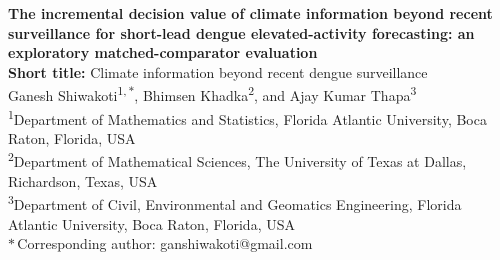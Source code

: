 \documentclass[11pt,a4paper]{article}
\begin{document}
\begin{center}
{\Large \textbf{The incremental decision value of climate information beyond recent surveillance for short-lead dengue elevated-activity forecasting: an exploratory matched-comparator evaluation}}\\[1.0em]

{\normalsize \textbf{Short title:} Climate information beyond recent dengue surveillance}\\[1.2em]

Ganesh Shiwakoti\textsuperscript{1,\,$\ast$}, Bhimsen Khadka\textsuperscript{2}, and Ajay Kumar Thapa\textsuperscript{3}\\[0.6em]

\footnotesize
\textsuperscript{1}Department of Mathematics and Statistics, Florida Atlantic University, Boca Raton, Florida, USA\\
\textsuperscript{2}Department of Mathematical Sciences, The University of Texas at Dallas, Richardson, Texas, USA\\
\textsuperscript{3}Department of Civil, Environmental and Geomatics Engineering, Florida Atlantic University, Boca Raton, Florida, USA\\[0.3em]
$\ast$\,Corresponding author: ganshiwakoti@gmail.com
\end{center}

\vspace{1em}
\begin{center}
\end{center}

\newpage
\end{document}
